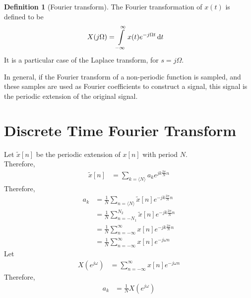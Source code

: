 \documentclass[titlepage, fleqn, a4paper, 12pt, twoside]{article}
\theoremstyle{definition}
\newtheorem{definition}{Definition}
\theoremstyle{theorem}
\renewcommand{\tilde}{\widetilde}
\begin{document}
\begin{definition}[Fourier transform]
	The Fourier transformation of $x(t)$ is defined to be
	\begin{align*}
		X(j \Omega) &= \int\limits_{-\infty}^{\infty} x(t) e^{-j \Omega t} \dif t
	\end{align*}
	It is a particular case of the Laplace transform, for $s = j \Omega$.
\end{definition}

In general, if the Fourier transform of a non-periodic function is sampled, and these samples are used as Fourier coefficients to construct a signal, this signal is the periodic extension of the original signal.

\section{Discrete Time Fourier Transform}

Let $\tilde{x}[n]$ be the periodic extension of $x[n]$ with period $N$.\\
Therefore,
\begin{align*}
	\tilde{x}[n] &= \sum\limits_{k = \langle N \rangle} a_k e^{j k \frac{2 \pi}{N} n}
\end{align*}
Therefore,
\begin{align*}
	a_k &= \frac{1}{N} \sum\limits_{n = \langle N \rangle} \tilde{x}[n] e^{-j k \frac{2 \pi}{N} n}\\
	&= \frac{1}{N} \sum\limits_{n = -N_1}^{N_2} \tilde{x}[n] e^{-j k \frac{2 \pi}{N} n}\\
	&= \frac{1}{N} \sum\limits_{n = -\infty}^{\infty} x[n] e^{-j k \frac{2 \pi}{N} n}\\
	&= \frac{1}{N} \sum\limits_{n = -\infty}^{\infty} x[n] e^{-j \omega n}
\end{align*}
Let
\begin{align*}
	X\left( e^{j \omega} \right) &= \sum\limits_{n = -\infty}^{\infty} x[n] e^{-j \omega n}
\end{align*}
Therefore,
\begin{align*}
	a_k &= \frac{1}{N} X\left( e^{j \omega} \right)
\end{align*}
\end{document}
